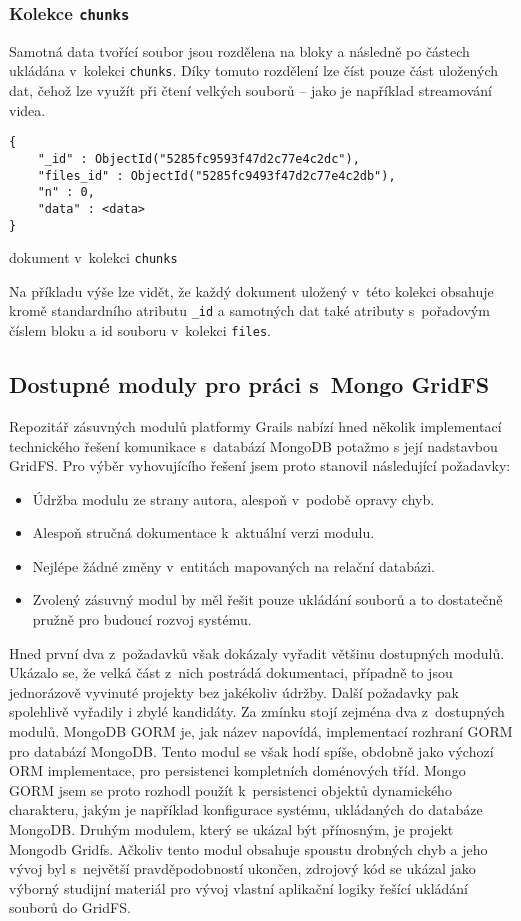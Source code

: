 \subsubsection{\textbf{Kolekce \texttt{chunks}}}
Samotná data tvořící soubor jsou rozdělena na bloky a následně po částech ukládána v~kolekci \texttt{chunks}. Díky tomuto rozdělení lze číst  pouze část uložených dat, čehož lze využít při čtení velkých souborů -- jako je například streamování videa.
\begin{example}
\centering
\begin{lstlisting}
{
    "_id" : ObjectId("5285fc9593f47d2c77e4c2dc"),
    "files_id" : ObjectId("5285fc9493f47d2c77e4c2db"),
    "n" : 0,
    "data" : <data>
}
\end{lstlisting}
\caption{dokument v~kolekci \texttt{chunks}}
\end{example}
Na příkladu výše lze vidět, že každý dokument uložený v~této kolekci obsahuje kromě standardního atributu \texttt{\_id} a samotných dat také atributy s~pořadovým číslem bloku a id  souboru v~kolekci \texttt{files}.

\subsection{Dostupné moduly pro práci s~Mongo GridFS}
Repozitář zásuvných modulů platformy Grails nabízí hned několik implementací technického řešení komunikace s~databází MongoDB potažmo s její nadstavbou GridFS. Pro výběr vyhovujícího řešení jsem proto stanovil následující požadavky:

\begin{itemize}
\item Údržba modulu ze strany autora, alespoň v~podobě opravy chyb.
\item Alespoň stručná dokumentace k~aktuální verzi modulu.
\item Nejlépe žádné změny v~entitách mapovaných na relační databázi.
\item Zvolený zásuvný modul by měl řešit pouze ukládání souborů a to dostatečně pružně pro budoucí rozvoj systému.
\end{itemize}

Hned první dva z~požadavků však dokázaly vyřadit většinu dostupných modulů. Ukázalo se, že velká část z~nich postrádá dokumentaci, případně to jsou jednorázově vyvinuté projekty bez jakékoliv údržby. Další požadavky pak spolehlivě vyřadily i zbylé kandidáty. Za zmínku stojí zejména dva z~dostupných modulů. MongoDB GORM je, jak název napovídá, implementací rozhraní GORM pro databází MongoDB. Tento modul se však hodí spíše, obdobně jako výchozí ORM implementace, pro persistenci kompletních doménových tříd. Mongo GORM jsem se proto rozhodl použít k~persistenci objektů dynamického charakteru, jakým je například konfigurace systému, ukládaných do databáze MongoDB. Druhým modulem, který se ukázal být přínosným, je projekt Mongodb Gridfs. Ačkoliv tento modul obsahuje spoustu drobných chyb a jeho vývoj byl s~největší pravděpodobností ukončen, zdrojový kód se ukázal jako výborný studijní materiál pro vývoj vlastní aplikační logiky řešící ukládání souborů do GridFS.
